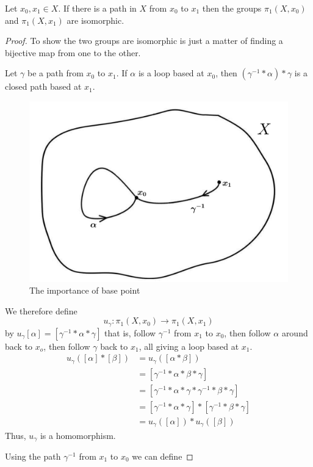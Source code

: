\medskip
\begin{thm}

Let $x_0,x_1\in X$. If there is a path in $X$ from $x_0$ to $x_1$ then the groups $\pi_1(X,x_0)$ and $\pi_1(X,x_1)$ are isomorphic.

\end{thm}

\begin{proof}
To show the two groups are isomorphic is just a matter of finding a bijective map from one to the other.

Let $\gamma$ be a path from $x_0$ to $x_1$. If $\alpha$ is a loop based at $x_0$, then $(\gamma^{-1}\ast\alpha)\ast \gamma $ is a closed path based at $x_1$.

\begin{figure}[hbt!]
\centering
\includegraphics[width=.45\textwidth]{./images/loop.jpg}
\caption{The importance of base point}
\end{figure}



We therefore define $$ u_\gamma:\pi_1(X,x_0)\rightarrow \pi_1(X,x_1)  $$
by $u_\gamma[\alpha]=[\gamma^{-1}\ast\alpha\ast\gamma]$ that is, follow $\gamma^{-1}$ from $x_1$ to $x_0$, then follow $\alpha$ around back to $x_o$, then follow $\gamma$ back to $x_1$, all giving a loop based at $x_1$.
\begin{align*}
u_\gamma([\alpha]\ast[\beta])&=u_\gamma([\alpha\ast\beta])\\
                             &=[\gamma^{-1}\ast\alpha\ast\beta\ast\gamma]\\
                             &=[\gamma^{-1}\ast\alpha\ast\gamma\ast\gamma^{-1}\ast\beta\ast\gamma]\\
                             &=[\gamma^{-1}\ast\alpha\ast\gamma]\ast[\gamma^{-1}\ast\beta\ast\gamma]\\
                             &=u_\gamma([\alpha])\ast u_\gamma([\beta])
\end{align*}
Thus, $u_\gamma$ is a homomorphism.

Using the path $\gamma^{-1}$ from $x_1$ to $x_0$ we can define


\end{proof}
